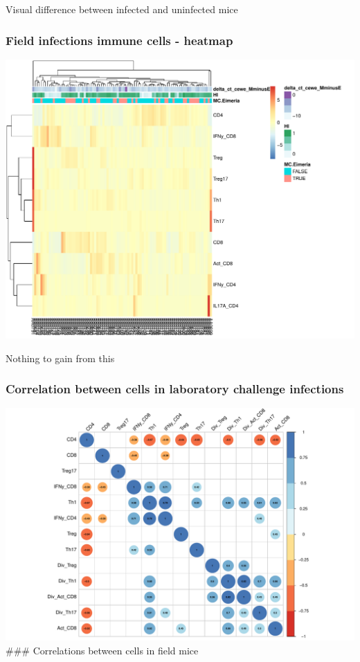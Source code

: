 \documentclass[
]{article}
\begin{document}
Visual difference between infected and uninfected mice

\subsubsection{Field infections immune cells -
heatmap}\label{field-infections-immune-cells---heatmap}

\includegraphics{Explorative_Stats_experimental_planning_files/figure-latex/HEATMAP_field_facs-1.pdf}

Nothing to gain from this

\subsubsection{Correlation between cells in laboratory challenge
infections}\label{correlation-between-cells-in-laboratory-challenge-infections}

\includegraphics{Explorative_Stats_experimental_planning_files/figure-latex/facs_core-1.pdf}
\#\#\# Correlations between cells in field mice
\end{document}

